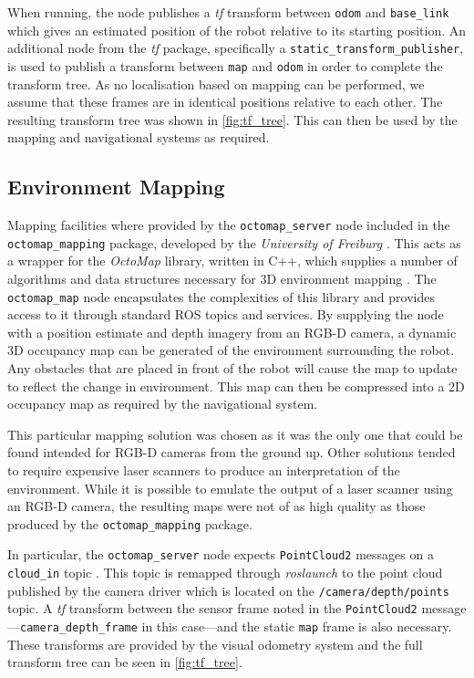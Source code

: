 When running, the node publishes a \emph{tf} transform between \texttt{odom} and \texttt{base\_link} which gives an estimated position of the robot relative to its starting position. An additional node from the \emph{tf} package, specifically a \texttt{static\_transform\_publisher}, is used to publish a transform between \texttt{map} and \texttt{odom} in order to complete the transform tree. As no localisation based on mapping can be performed, we assume that these frames are in identical positions relative to each other. The resulting transform tree was shown in \autoref{fig:tf_tree}. This can then be used by the mapping and navigational systems as required.

\subsection{Environment Mapping}

Mapping facilities where provided by the \texttt{octomap\_server} node included in the \texttt{octomap\_mapping} package, developed by the \emph{University of Freiburg} \cite{ros_wiki_octomap}. This acts as a wrapper for the \emph{OctoMap} library, written in C++, which supplies a number of algorithms and data structures necessary for 3D environment mapping \cite{octomap, hornung13auro}. The \texttt{octomap\_map} node encapsulates the complexities of this library and provides access to it through standard ROS topics and services. By supplying the node with a position estimate and depth imagery from an RGB-D camera, a dynamic 3D occupancy map can be generated of the environment surrounding the robot. Any obstacles that are placed in front of the robot will cause the map to update to reflect the change in environment. This map can then be compressed into a 2D occupancy map as required by the navigational system.

This particular mapping solution was chosen as it was the only one that could be found intended for RGB-D cameras from the ground up. Other solutions tended to require expensive laser scanners to produce an interpretation of the environment. While it is possible to emulate the output of a laser scanner using an RGB-D camera, the resulting maps were not of as high quality as those produced by the \texttt{octomap\_mapping} package. 

In particular, the \texttt{octomap\_server} node expects \texttt{PointCloud2} messages on a \texttt{cloud\_in} topic \cite{ros_wiki_octomap_server}. This topic is remapped through \emph{roslaunch} to the point cloud published by the camera driver which is located on the \texttt{/camera/depth/points} topic. A \emph{tf} transform between the sensor frame noted in the \texttt{PointCloud2} message---\texttt{camera\_depth\_frame} in this case---and the static \texttt{map} frame is also necessary. These transforms are provided by the visual odometry system and the full transform tree can be seen in \autoref{fig:tf_tree}.


